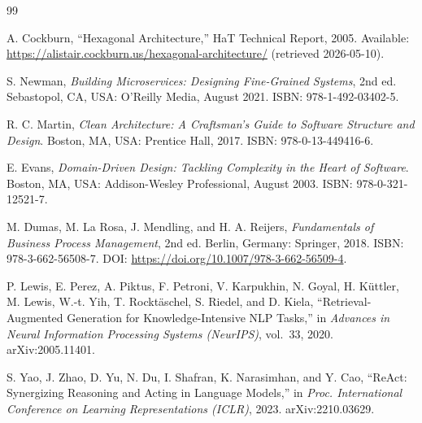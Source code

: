 \adjustmtc
\renewcommand\bibname{BIBLIOGRAPHY}
\begin{thebibliography}{99}
\thispagestyle{MyStyle}



A. Cockburn, ``Hexagonal Architecture,'' HaT Technical Report, 2005.
Available: \url{https://alistair.cockburn.us/hexagonal-architecture/}
(retrieved 2026-05-10).

S. Newman, \emph{Building Microservices: Designing Fine-Grained Systems},
2nd ed. Sebastopol, CA, USA: O'Reilly Media, August 2021.
ISBN: 978-1-492-03402-5.

R. C. Martin, \emph{Clean Architecture: A Craftsman's Guide to Software Structure
and Design}. Boston, MA, USA: Prentice Hall, 2017. ISBN: 978-0-13-449416-6.

E. Evans, \emph{Domain-Driven Design: Tackling Complexity in the Heart of
Software}. Boston, MA, USA: Addison-Wesley Professional, August 2003.
ISBN: 978-0-321-12521-7.

M. Dumas, M. La Rosa, J. Mendling, and H. A. Reijers, \emph{Fundamentals of
Business Process Management}, 2nd ed. Berlin, Germany: Springer, 2018.
ISBN: 978-3-662-56508-7. DOI: \url{https://doi.org/10.1007/978-3-662-56509-4}.


P. Lewis, E. Perez, A. Piktus, F. Petroni, V. Karpukhin, N. Goyal, H. K\"uttler,
M. Lewis, W.-t. Yih, T. Rockt\"aschel, S. Riedel, and D. Kiela,
``Retrieval-Augmented Generation for Knowledge-Intensive NLP Tasks,''
in \emph{Advances in Neural Information Processing Systems (NeurIPS)}, vol.~33,
2020. arXiv:2005.11401.

S. Yao, J. Zhao, D. Yu, N. Du, I. Shafran, K. Narasimhan, and Y. Cao,
``ReAct: Synergizing Reasoning and Acting in Language Models,''
in \emph{Proc. International Conference on Learning Representations (ICLR)},
2023. arXiv:2210.03629.


\end{thebibliography}
